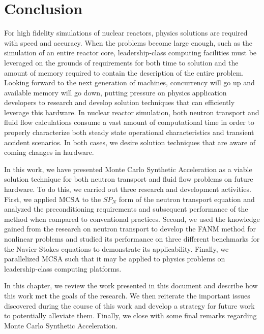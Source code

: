 \chapter{Conclusion\ }
\label{ch:conclusion}

For high fidelity simulations of nuclear reactors, physics solutions
are required with speed and accuracy. When the problems become large
enough, such as the simulation of an entire reactor core,
leadership-class computing facilities must be leveraged on the grounds
of requirements for both time to solution and the amount of memory
required to contain the description of the entire problem. Looking
forward to the next generation of machines, concurrency will go up and
available memory will go down, putting pressure on physics application
developers to research and develop solution techniques that can
efficiently leverage this hardware. In nuclear reactor simulation,
both neutron transport and fluid flow calculations consume a vast
amount of computational time in order to properly characterize both
steady state operational characteristics and transient accident
scenarios. In both cases, we desire solution techniques that are aware
of coming changes in hardware.

In this work, we have presented Monte Carlo Synthetic Acceleration as
a viable solution technique for both neutron transport and fluid flow
problems on future hardware. To do this, we carried out three research
and development activities. First, we applied MCSA to the $SP_N$ form
of the neutron transport equation and analyzed the preconditioning
requirements and subsequent performance of the method when compared to
conventional practices. Second, we used the knowledge gained from the
research on neutron transport to develop the FANM method for nonlinear
problems and studied its performance on three different benchmarks for
the Navier-Stokes equations to demonstrate its applicability. Finally,
we parallelized MCSA such that it may be applied to physics problems
on leadership-class computing platforms.

In this chapter, we review the work presented in this document and
describe how this work met the goals of the research. We then
reiterate the important issues discovered during the course of this
work and develop a strategy for future work to potentially alleviate
them. Finally, we close with some final remarks regarding Monte Carlo
Synthetic Acceleration.

